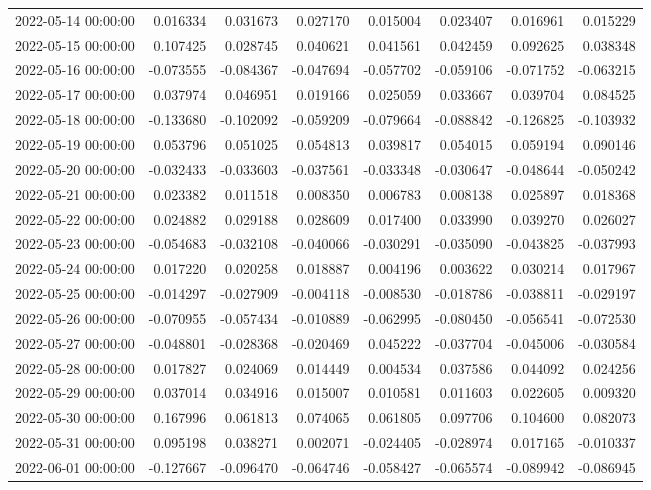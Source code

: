 \begin{tabular}{lrrrrrrr}
2022-05-14 00:00:00 & 0.016334 & 0.031673 & 0.027170 & 0.015004 & 0.023407 & 0.016961 & 0.015229 \\
2022-05-15 00:00:00 & 0.107425 & 0.028745 & 0.040621 & 0.041561 & 0.042459 & 0.092625 & 0.038348 \\
2022-05-16 00:00:00 & -0.073555 & -0.084367 & -0.047694 & -0.057702 & -0.059106 & -0.071752 & -0.063215 \\
2022-05-17 00:00:00 & 0.037974 & 0.046951 & 0.019166 & 0.025059 & 0.033667 & 0.039704 & 0.084525 \\
2022-05-18 00:00:00 & -0.133680 & -0.102092 & -0.059209 & -0.079664 & -0.088842 & -0.126825 & -0.103932 \\
2022-05-19 00:00:00 & 0.053796 & 0.051025 & 0.054813 & 0.039817 & 0.054015 & 0.059194 & 0.090146 \\
2022-05-20 00:00:00 & -0.032433 & -0.033603 & -0.037561 & -0.033348 & -0.030647 & -0.048644 & -0.050242 \\
2022-05-21 00:00:00 & 0.023382 & 0.011518 & 0.008350 & 0.006783 & 0.008138 & 0.025897 & 0.018368 \\
2022-05-22 00:00:00 & 0.024882 & 0.029188 & 0.028609 & 0.017400 & 0.033990 & 0.039270 & 0.026027 \\
2022-05-23 00:00:00 & -0.054683 & -0.032108 & -0.040066 & -0.030291 & -0.035090 & -0.043825 & -0.037993 \\
2022-05-24 00:00:00 & 0.017220 & 0.020258 & 0.018887 & 0.004196 & 0.003622 & 0.030214 & 0.017967 \\
2022-05-25 00:00:00 & -0.014297 & -0.027909 & -0.004118 & -0.008530 & -0.018786 & -0.038811 & -0.029197 \\
2022-05-26 00:00:00 & -0.070955 & -0.057434 & -0.010889 & -0.062995 & -0.080450 & -0.056541 & -0.072530 \\
2022-05-27 00:00:00 & -0.048801 & -0.028368 & -0.020469 & 0.045222 & -0.037704 & -0.045006 & -0.030584 \\
2022-05-28 00:00:00 & 0.017827 & 0.024069 & 0.014449 & 0.004534 & 0.037586 & 0.044092 & 0.024256 \\
2022-05-29 00:00:00 & 0.037014 & 0.034916 & 0.015007 & 0.010581 & 0.011603 & 0.022605 & 0.009320 \\
2022-05-30 00:00:00 & 0.167996 & 0.061813 & 0.074065 & 0.061805 & 0.097706 & 0.104600 & 0.082073 \\
2022-05-31 00:00:00 & 0.095198 & 0.038271 & 0.002071 & -0.024405 & -0.028974 & 0.017165 & -0.010337 \\
2022-06-01 00:00:00 & -0.127667 & -0.096470 & -0.064746 & -0.058427 & -0.065574 & -0.089942 & -0.086945 \\

\end{tabular}
